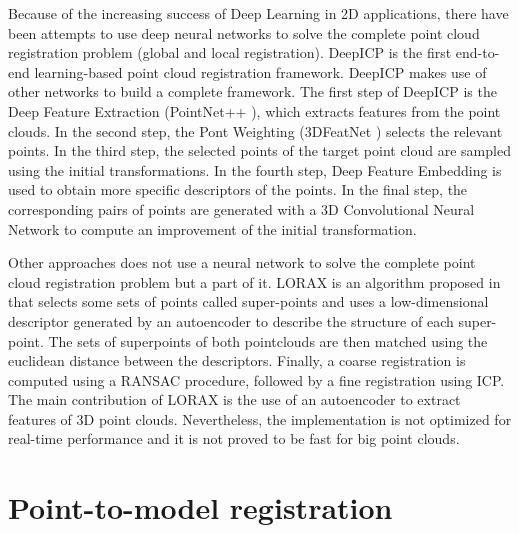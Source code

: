         Because of the increasing success of Deep Learning in 2D applications, there have been attempts to use deep neural networks
        to solve the complete point cloud registration problem (global and local registration).
        DeepICP \cite{Lu_2019_deepicp} is the first end-to-end learning-based point cloud registration framework.
        DeepICP makes use of other networks to build a complete framework.
        The first step of DeepICP is the Deep Feature Extraction (PointNet++ \cite{Qi_2017_pointnet}), which extracts features from the point clouds.
        In the second step, the Pont Weighting (3DFeatNet \cite{Yew_2018_3dfeat}) selects the relevant points.
        In the third step, the selected points of the target point cloud are sampled using the initial transformations.
        In the fourth step, Deep Feature Embedding is used to obtain more specific descriptors of the points.
        In the final step, the corresponding pairs of points are generated with a 3D Convolutional Neural Network
        to compute an improvement of the initial transformation.
        
        Other approaches does not use a neural network to solve the complete point cloud registration problem but a part of it.
        LORAX is an algorithm proposed in \cite{Elbaz_2017_3dpoint} that selects some sets of points called super-points and uses a low-dimensional descriptor 
        generated by an autoencoder to describe the structure of each super-point.
        The sets of superpoints of both pointclouds are then matched using the euclidean distance between the descriptors.
        Finally, a coarse registration is computed using a RANSAC procedure, followed by a fine registration using ICP.
        The main contribution of LORAX is the use of an autoencoder to extract features of 3D point clouds. 
        Nevertheless, the implementation is not optimized for real-time performance and it is not proved to be fast for big point clouds.

    \section{Point-to-model registration}

